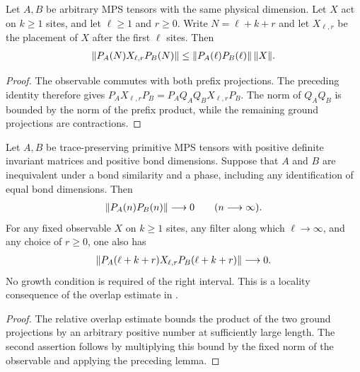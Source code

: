 \begin{lemma}
    \label{thm:bulk_cross_compression_prefix_bound}
    \leanok
    Let $A,B$ be arbitrary MPS tensors with the same physical dimension.
    Let $X$ act on $k\geq1$ sites, and let $\ell\geq1$ and $r\geq0$.
    Write $N=\ell+k+r$ and let $X_{\ell,r}$ be the placement of $X$ after
    the first $\ell$ sites. Then
    \begin{align}
        \|P_A(N)X_{\ell,r}P_B(N)\|
        \leq \|P_A(\ell)P_B(\ell)\|\,\|X\|.
        \notag
    \end{align}
\end{lemma}
\begin{proof}\leanok
    The observable commutes with both prefix projections. The preceding
    identity therefore gives
    $P_AX_{\ell,r}P_B=P_AQ_AQ_BX_{\ell,r}P_B$.
    The norm of $Q_AQ_B$ is bounded by the norm of the prefix product,
    while the remaining ground projections are contractions.
\end{proof}

\begin{lemma}
    \label{thm:bulk_cross_compression_decay}
    \leanok
    Let $A,B$ be trace-preserving primitive MPS tensors with positive
    definite invariant matrices and positive bond dimensions. Suppose that $A$ and $B$ are inequivalent under a bond
    similarity and a phase, including any identification of equal bond
    dimensions. Then
    \begin{align}
        \|P_A(n)P_B(n)\|\longrightarrow0\qquad(n\longrightarrow\infty).
        \notag
    \end{align}
    For any fixed observable $X$ on $k\geq1$ sites, any filter along which
    $\ell\longrightarrow\infty$, and any choice of $r\geq0$, one also has
    \begin{align}
        \|P_A(\ell+k+r)X_{\ell,r}P_B(\ell+k+r)\|
        \longrightarrow0.
        \notag
    \end{align}
    No growth condition is required of the right interval. This is a
    locality consequence of the overlap estimate in
    \cite[proof of the lemma on distinct local support spaces]{Nachtergaele1996Spectral}.
\end{lemma}
\begin{proof}\leanok
    The relative overlap estimate bounds the product of the two ground
    projections by an arbitrary positive number at sufficiently large
    length. The second assertion follows by multiplying this bound by
    the fixed norm of the observable and applying the preceding lemma.
\end{proof}

